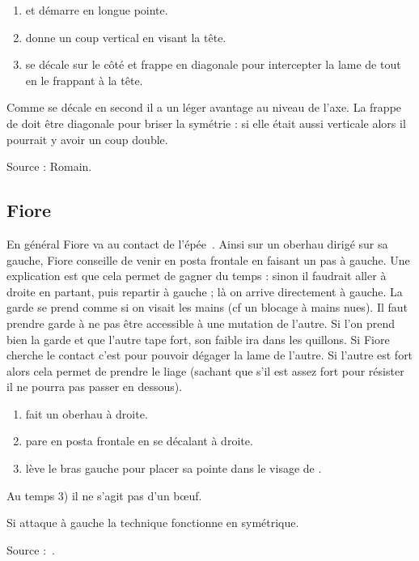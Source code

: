 \begin{technique}

\begin{enumerate}
	\item \A et \D démarre en longue pointe.
	
	\item \A donne un coup vertical en visant la tête.
	
	\item \D se décale sur le côté et frappe en diagonale pour intercepter la lame de \A tout en le frappant à la tête.
\end{enumerate}

Comme \D se décale en second il a un léger avantage au niveau de l'axe.
La frappe de \D doit être diagonale pour briser la symétrie : si elle était aussi verticale alors il pourrait y avoir un coup double.

Source : Romain.
\end{technique}


\subsection{Fiore}


En général Fiore va au contact de l'épée~\cite{campo:dijon:posta_frontale:2015}.
Ainsi sur un oberhau dirigé sur sa gauche, Fiore conseille de venir en posta frontale en faisant un pas à gauche.
Une explication est que cela permet de gagner du temps : sinon il faudrait aller à droite en partant, puis repartir à gauche ; là on arrive directement à gauche.
La garde se prend comme si on visait les mains (cf un blocage à mains nues).
Il faut prendre garde à ne pas être accessible à une mutation de l'autre.
Si l'on prend bien la garde et que l'autre tape fort, son faible ira dans les quillons.
Si Fiore cherche le contact c'est pour pouvoir dégager la lame de l'autre.
Si l'autre est fort alors cela permet de prendre le liage (sachant que s'il est assez fort pour résister il ne pourra pas passer en dessous).


\begin{technique}

\begin{enumerate}
	\item \A fait un oberhau à droite.
	\item \D pare en posta frontale en se décalant à droite.
	\item \D lève le bras gauche pour placer sa pointe dans le visage de \A.
\end{enumerate}

Au temps 3) il ne s'agit pas d'un bœuf.

Si \A attaque à gauche la technique fonctionne en symétrique.

Source :~\cite{campo:dijon:posta_frontale:2015}.

\end{technique}


